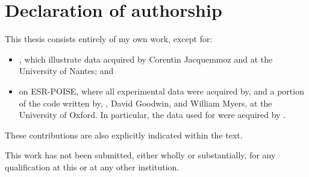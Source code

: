 \chapter{Declaration of authorship}

This thesis consists entirely of my own work, except for:

\begin{itemize}
    \item {}, which illustrate data acquired by Corentin Jacquemmoz and \JND{} at the University of Nantes; and
    \item {} on ESR-POISE, where all experimental data were acquired by, and a portion of the code written by, \JBV{}, David Goodwin, and William Myers, at the University of Oxford.
        In particular, the data used for  were acquired by \JBV{}.
\end{itemize}

These contributions are also explicitly indicated within the text.

This work has not been submitted, either wholly or substantially, for any qualification at this or at any other institution.
